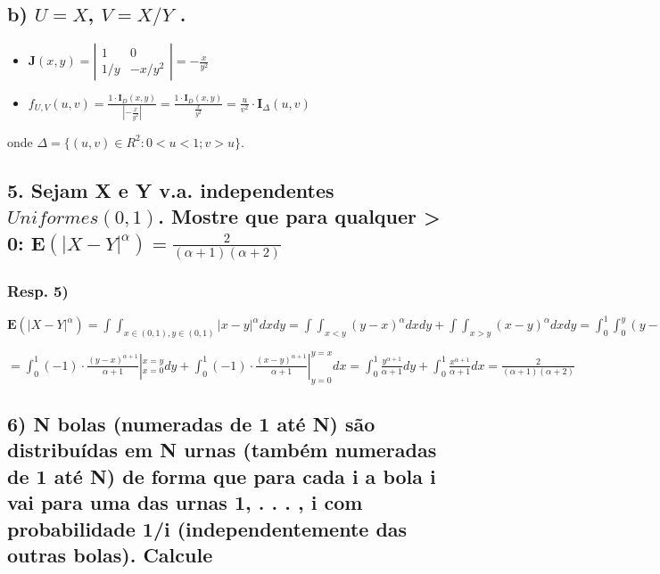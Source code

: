 \documentclass[portuguese]{article}
\DeclareRobustCommand{\greektext}{%
  \fontencoding{LGR}\selectfont\def\encodingdefault{LGR}}
\DeclareRobustCommand{\textgreek}[1]{\leavevmode{\greektext #1}}
\begin{document}
\subsection*{\textmd{b) $U=X$, $V=X/Y$ .}}
\begin{itemize}
\item $\mathbf{J}(x,y)=\left|\begin{array}{cc}
1 & 0\\
1/y & -x/y^{2}
\end{array}\right|=-\frac{x}{y^{2}}$
\item $f_{U,V}(u,v)=\frac{1\cdot\mathbf{I}_{D}(x,y)}{\left|-\frac{x}{y^{2}}\right|}=\frac{1\cdot\mathbf{I}_{D}(x,y)}{\frac{x}{y^{2}}}=\frac{u}{v^{2}}\cdot\mathbf{I}_{\Delta}(u,v)$
\end{itemize}
onde $\Delta=\{ (u,v)\in R^2: 0<u<1; v>u \}$.
\subsection*{\textcompwordmark{}}


\subsection*{\textmd{5. Sejam X e Y v.a. independentes $Uniformes(0,1)$. Mostre
que para qualquer \textgreek{a} > 0: $\mathbf{E}(\left|X-Y\right|^{\alpha})=\frac{2}{(\alpha+1)(\alpha+2)}$}}


\subsubsection*{\textmd{Resp}. \textmd{5)}}

$\mathbf{E}(\left|X-Y\right|^{\alpha})=\int\int_{x\in(0,1),y\in(0,1)}\left|x-y\right|^{\alpha}dxdy=\int\int_{x<y}(y-x)^{\alpha}dxdy+\int\int_{x>y}(x-y)^{\alpha}dxdy=\int_{0}^{1}\int_{0}^{y}(y-x)^{\alpha}dxdy+\int_{0}^{1}\int_{0}^{x}(x-y)^{\alpha}dydx=$

$=\int_{0}^{1}(-1)\cdot\frac{(y-x)^{\alpha+1}}{\alpha+1}|_{x=0}^{x=y}dy+\int_{0}^{1}(-1)\cdot\frac{(x-y)^{\alpha+1}}{\alpha+1}|_{y=0}^{y=x}dx=\int_{0}^{1}\frac{y{}^{\alpha+1}}{\alpha+1}dy+\int_{0}^{1}\frac{x{}^{\alpha+1}}{\alpha+1}dx=\frac{2}{(\alpha+1)(\alpha+2)}$


\subsection*{\textcompwordmark{}}


\subsection*{\textmd{6) N bolas (numeradas de 1 até N) são distribuídas em N urnas
(também numeradas de 1 até N) de forma que para cada i a bola i vai
para uma das urnas 1, . . . , i com probabilidade 1/i (independentemente
das outras bolas). Calcule}}
\end{document}
